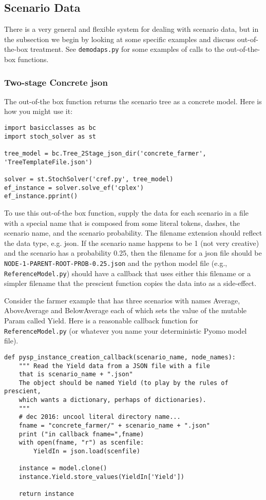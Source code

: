 \documentclass[12pt]{article}
\begin{document}
\subsection{Scenario Data}

There is a very general and flexible system for dealing with scenario data,
but in the subsection we begin by looking at some specific examples
and discuss out-of-the-box treatment. See 
\verb|demodaps.py| for some examples of calls to the out-of-the-box functions.

\subsubsection{Two-stage Concrete json}

The out-of-the box function returns the scenario tree as a concrete model.
Here is how you might use it:

\begin{verbatim}
import basicclasses as bc
import stoch_solver as st

tree_model = bc.Tree_2Stage_json_dir('concrete_farmer', 'TreeTemplateFile.json')

solver = st.StochSolver('cref.py', tree_model)
ef_instance = solver.solve_ef('cplex')
ef_instance.pprint()

\end{verbatim}

To use this out-of-the box function, supply the data for each scenario in
a file with a special name that is composed from some literal tokens, dashes,
the scenario name, and the scenario probability. The filename extension
should reflect the data type, e.g. json. If the scenario name happens to be 1 (not very creative) and the scenario has a probability 0.25, then the filename
for a json file should be \verb|NODE-1-PARENT-ROOT-PROB-0.25.json| and
the python model file (e.g., \verb|ReferenceModel.py|) should have a
callback that uses either this filename or a simpler filename that the
prescient function copies the data into as a side-effect.

Consider the farmer example that has three scenarios with names Average,
AboveAverage and BelowAverage each of which sets the value of the mutable
Param called Yield. Here is a reasonable callback function
for \verb|ReferenceModel.py| (or whatever you name your
deterministic Pyomo model file).

\begin{verbatim}
def pysp_instance_creation_callback(scenario_name, node_names):
    """ Read the Yield data from a JSON file with a file 
    that is scenario_name + ".json"
    The object should be named Yield (to play by the rules of prescient,
    which wants a dictionary, perhaps of dictionaries).
    """
    # dec 2016: uncool literal directory name...
    fname = "concrete_farmer/" + scenario_name + ".json"
    print ("in callback fname=",fname)
    with open(fname, "r") as scenfile:
        YieldIn = json.load(scenfile)

    instance = model.clone()
    instance.Yield.store_values(YieldIn['Yield'])

    return instance
\end{verbatim}
\end{document}
